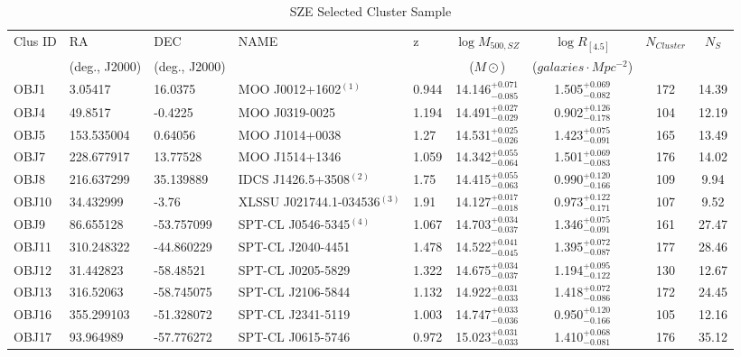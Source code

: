 \documentclass[apj,twocolumn]{emulateapj}
\begin{document}
{\begin{table}[h!]
\caption{SZE Selected Cluster Sample}
\label{table:2} 
\centering
\tiny
\begin{tabular}{l l l l l c c c c} %
\hline
\hline
Clus ID	& RA	 & DEC	& NAME	& z & $\log M_{500, SZ}$  & 	$\log R_{[4.5]}$ & $N_{Cluster}$ &  $N_{S}$ \\
                  & (deg., J2000) & (deg., J2000) & &  & ($M\odot$) & ($galaxies \cdot Mpc^{-2}$) & & \\
\hline
\hline
 OBJ1  & 3.05417    & 16.0375    &  MOO J0012+1602$^{(1)}$         & 0.944  & 14.146$^{+0.071}_{-0.085}$ & 1.505$^{+0.069}_{-0.082}$ &   172 & 14.39 \\
 OBJ4  & 49.8517    & -0.4225    &  MOO J0319-0025         & 1.194  & 14.491$^{+0.027}_{-0.029}$ & 0.902$^{+0.126}_{-0.178}$ &   104 & 12.19 \\
 OBJ5  & 153.535004 & 0.64056    &  MOO J1014+0038         & 1.27   & 14.531$^{+0.025}_{-0.026}$ & 1.423$^{+0.075}_{-0.091}$ &   165 & 13.49 \\
 OBJ7  & 228.677917 & 13.77528   &  MOO J1514+1346         & 1.059  & 14.342$^{+0.055}_{-0.064}$ & 1.501$^{+0.069}_{-0.083}$ &   176 & 14.02 \\
 OBJ8  & 216.637299 & 35.139889  &  IDCS J1426.5+3508$^{(2)}$     & 1.75   & 14.415$^{+0.055}_{-0.063}$ & 0.990$^{+0.120}_{-0.166}$ &   109 & 9.94  \\
 OBJ10 & 34.432999  & -3.76      &  XLSSU J021744.1-034536$^{(3)}$ & 1.91   & 14.127$^{+0.017}_{-0.018}$ & 0.973$^{+0.122}_{-0.171}$ &   107 & 9.52  \\
 OBJ9  & 86.655128  & -53.757099 &  SPT-CL J0546-5345$^{(4)}$      & 1.067  & 14.703$^{+0.034}_{-0.037}$ & 1.346$^{+0.075}_{-0.091}$ &   161 & 27.47 \\
 OBJ11 & 310.248322 & -44.860229 &  SPT-CL J2040-4451      & 1.478  & 14.522$^{+0.041}_{-0.045}$ & 1.395$^{+0.072}_{-0.087}$ &   177 & 28.46 \\
 OBJ12 & 31.442823  & -58.48521  &  SPT-CL J0205-5829      & 1.322  & 14.675$^{+0.034}_{-0.037}$ & 1.194$^{+0.095}_{-0.122}$ &   130 & 12.67 \\
 OBJ13 & 316.52063  & -58.745075 &  SPT-CL J2106-5844      & 1.132  & 14.922$^{+0.031}_{-0.033}$ & 1.418$^{+0.072}_{-0.086}$ &   172 & 24.45 \\
 OBJ16 & 355.299103 & -51.328072 &  SPT-CL J2341-5119      & 1.003  & 14.747$^{+0.033}_{-0.036}$ & 0.950$^{+0.120}_{-0.166}$ &   105 & 12.16 \\
 OBJ17 & 93.964989  & -57.776272 &  SPT-CL J0615-5746      & 0.972  & 15.023$^{+0.031}_{-0.033}$ & 1.410$^{+0.068}_{-0.081}$ &   176 & 35.12 \\

\end{tabular}
\end{table}}
\end{document}
